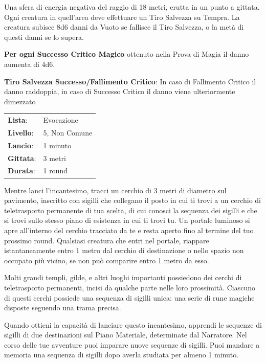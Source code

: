 \begin{multicols}{2}
Una sfera di energia negativa del raggio di 18 metri, erutta in un punto a gittata. Ogni creatura in quell'area deve effettuare un Tiro Salvezza su Tempra. La creatura subisce 8d6 danni da Vuoto se fallisce il Tiro Salvezza, o la metà di questi danni se lo supera.

\textbf{Per ogni Successo Critico Magico} ottenuto nella Prova di Magia il danno aumenta di 4d6.

\textbf{Tiro Salvezza Successo/Fallimento Critico}: In caso di Fallimento Critico il danno raddoppia, in caso di Successo Critico il danno viene ulteriormente dimezzato

\noindent\begin{tabularx}{\linewidth}{p{1.3cm}X}
	\rowcolor{gray!20}\textbf{Lista}: & Evocazione \\
	\textbf{Livello}: & 5, Non Comune \\
	\rowcolor{gray!20}\textbf{Lancio}: & 1 minuto \\
	\textbf{Gittata}: & 3 metri \\
	\rowcolor{gray!20}\textbf{Durata}: & 1 round \\
\end{tabularx}\smallskip

Mentre lanci l'incantesimo, tracci un cerchio di 3 metri di diametro sul pavimento, inscritto con sigilli che collegano il posto in cui ti trovi a un cerchio di teletrasporto permanente di tua scelta, di cui conosci la sequenza dei sigilli e che si trovi sullo stesso piano di esistenza in cui ti trovi tu. Un portale luminoso si apre all'interno del cerchio tracciato da te e resta aperto fino al termine del tuo prossimo round. Qualsiasi creatura che entri nel portale, riappare istantaneamente entro 1 metro dal cerchio di destinazione o nello spazio non occupato più vicino, se non può comparire entro 1 metro da esso.

Molti grandi templi, gilde, e altri luoghi importanti possiedono dei cerchi di teletrasporto permanenti, incisi da qualche parte nelle loro prossimità. Ciascuno di questi cerchi possiede una sequenza di sigilli unica: una serie di rune magiche disposte seguendo una trama precisa.

Quando ottieni la capacità di lanciare questo incantesimo, apprendi le sequenze di sigilli di due destinazioni sul Piano Materiale, determinate dal Narratore. Nel corso delle tue avventure puoi imparare nuove sequenze di sigilli. Puoi mandare a memoria una sequenza di sigilli dopo averla studiata per almeno 1 minuto.


\end{multicols}
